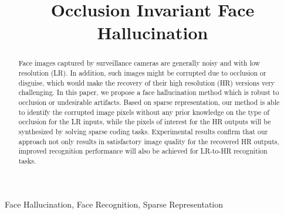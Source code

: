 \documentclass{article}
\title{Occlusion Invariant Face Hallucination}
\begin{document}
%
\maketitle
%
\begin{abstract}
Face images captured by surveillance cameras are generally noisy and with low resolution (LR). In addition, such images might be corrupted due to occlusion or disguise, which would make the recovery of their high resolution (HR) versions very challenging. In this paper, we propose a face hallucination method which is robust to occlusion or undesirable artifacts. Based on sparse representation, our method is able to identify the corrupted image pixels without any prior knowledge on the type of occlusion for the LR inputs, while the pixels of interest for the HR outputs will be synthesized by solving sparse coding tasks. Experimental results confirm that our approach not only results in satisfactory image quality for the recovered HR outputs, improved recognition performance will also be achieved for LR-to-HR recognition tasks.



\end{abstract}
%
\begin{keywords}
Face Hallucination, Face Recognition, Sparse Representation
\end{keywords}
%
\end{document}
